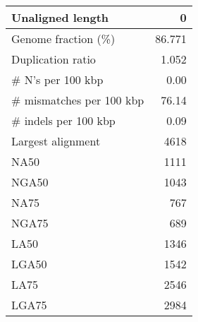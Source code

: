 \documentclass[12pt,a4paper]{article}
\begin{document}
\begin{table}[ht]
\begin{center}
\begin{tabular}{|l*{1}{|r}|}
Unaligned length & 0 \\ \hline
Genome fraction (\%) & 86.771 \\ \hline
Duplication ratio & 1.052 \\ \hline
\# N's per 100 kbp & 0.00 \\ \hline
\# mismatches per 100 kbp & 76.14 \\ \hline
\# indels per 100 kbp & 0.09 \\ \hline
Largest alignment & 4618 \\ \hline
NA50 & 1111 \\ \hline
NGA50 & 1043 \\ \hline
NA75 & 767 \\ \hline
NGA75 & 689 \\ \hline
LA50 & 1346 \\ \hline
LGA50 & 1542 \\ \hline
LA75 & 2546 \\ \hline
LGA75 & 2984 \\ \hline
\end{tabular}
\end{center}
\end{table}
\end{document}
